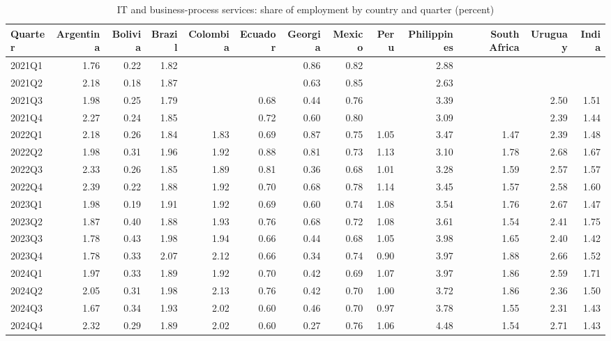 \renewcommand{\thetable}{A\arabic{table}}
\begin{table}
\centering
\scriptsize
\setlength{\tabcolsep}{3pt}
\begin{threeparttable}
\caption{IT and business-process services: share of employment by country and quarter (percent)}
\label{tab:itbpo_share}
\begin{tabular}{lrrrrrrrrrrrr}
\toprule
Quarter & Argentina & Bolivia & Brazil & Colombia & Ecuador & Georgia & Mexico & Peru & Philippines & South Africa & Uruguay & India \\
\midrule
2021Q1 & 1.76 & 0.22 & 1.82 &  &  & 0.86 & 0.82 &  & 2.88 &  &  &  \\
2021Q2 & 2.18 & 0.18 & 1.87 &  &  & 0.63 & 0.85 &  & 2.63 &  &  &  \\
2021Q3 & 1.98 & 0.25 & 1.79 &  & 0.68 & 0.44 & 0.76 &  & 3.39 &  & 2.50 & 1.51 \\
2021Q4 & 2.27 & 0.24 & 1.85 &  & 0.72 & 0.60 & 0.80 &  & 3.09 &  & 2.39 & 1.44 \\
2022Q1 & 2.18 & 0.26 & 1.84 & 1.83 & 0.69 & 0.87 & 0.75 & 1.05 & 3.47 & 1.47 & 2.39 & 1.48 \\
2022Q2 & 1.98 & 0.31 & 1.96 & 1.92 & 0.88 & 0.81 & 0.73 & 1.13 & 3.10 & 1.78 & 2.68 & 1.67 \\
2022Q3 & 2.33 & 0.26 & 1.85 & 1.89 & 0.81 & 0.36 & 0.68 & 1.01 & 3.28 & 1.59 & 2.57 & 1.57 \\
2022Q4 & 2.39 & 0.22 & 1.88 & 1.92 & 0.70 & 0.68 & 0.78 & 1.14 & 3.45 & 1.57 & 2.58 & 1.60 \\
2023Q1 & 1.98 & 0.19 & 1.91 & 1.92 & 0.69 & 0.60 & 0.74 & 1.08 & 3.54 & 1.76 & 2.67 & 1.47 \\
2023Q2 & 1.87 & 0.40 & 1.88 & 1.93 & 0.76 & 0.68 & 0.72 & 1.08 & 3.61 & 1.54 & 2.41 & 1.75 \\
2023Q3 & 1.78 & 0.43 & 1.98 & 1.94 & 0.66 & 0.44 & 0.68 & 1.05 & 3.98 & 1.65 & 2.40 & 1.42 \\
2023Q4 & 1.78 & 0.33 & 2.07 & 2.12 & 0.66 & 0.34 & 0.74 & 0.90 & 3.97 & 1.88 & 2.66 & 1.52 \\
2024Q1 & 1.97 & 0.33 & 1.89 & 1.92 & 0.70 & 0.42 & 0.69 & 1.07 & 3.97 & 1.86 & 2.59 & 1.71 \\
2024Q2 & 2.05 & 0.31 & 1.98 & 2.13 & 0.76 & 0.42 & 0.70 & 1.00 & 3.72 & 1.86 & 2.36 & 1.50 \\
2024Q3 & 1.67 & 0.34 & 1.93 & 2.02 & 0.60 & 0.46 & 0.70 & 0.97 & 3.78 & 1.55 & 2.31 & 1.43 \\
2024Q4 & 2.32 & 0.29 & 1.89 & 2.02 & 0.60 & 0.27 & 0.76 & 1.06 & 4.48 & 1.54 & 2.71 & 1.43 \\

\end{tabular}
\end{threeparttable}
\end{table}
